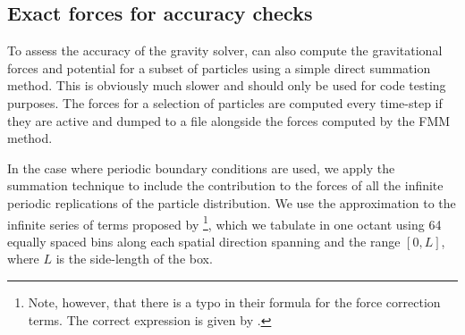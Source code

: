 \subsection{Exact forces for accuracy checks}
\label{ssec:exact_forces}

To assess the accuracy of the gravity solver, \swift can also compute
the gravitational forces and potential for a subset of particles using
a simple direct summation method. This is obviously much slower and
should only be used for code testing purposes. The forces for a
selection of particles are computed every time-step if they are active
and dumped to a file alongside the forces computed by the FMM method.

In the case where periodic boundary conditions are used, we apply the
\cite{Ewald1921} summation technique to include the contribution to
the forces of all the infinite periodic replications of the particle
distribution. We use the approximation to the infinite series of terms
proposed by \cite{Hernquist1991}\footnote{Note, however, that there is
a typo in their formula for the force correction terms. The correct
expression is given by \cite{Klessen1997} \citep[see
also][]{Hubber2011}.}, which we tabulate in one octant using 64
equally spaced bins along each spatial direction spanning and the
range $[0,L]$, where $L$ is the side-length of the box.
